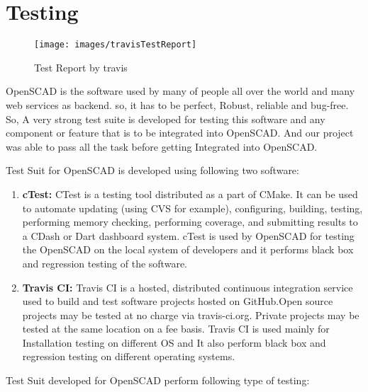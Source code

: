 \section{Testing}
\begin{figure}[H]
    \centering
    \texttt{[image: images/travisTestReport]}
    \caption{Test Report by travis}
    \label{fig:travisTestReport}
\end{figure}

OpenSCAD is the software used by many of people all over the world and many web services as backend. so, it has to be perfect, Robust, reliable and bug-free. So, A very strong test suite is developed for testing this software and any component or feature that is to be integrated into OpenSCAD. And our project was able to pass all the task before getting Integrated into OpenSCAD.

Test Suit for OpenSCAD is developed using following two software:

\begin{enumerate}
    \item \textbf{cTest:} CTest is a testing tool distributed as a part of CMake. It can be used to automate updating (using CVS for example), configuring, building, testing, performing memory checking, performing coverage, and submitting results to a CDash or Dart dashboard system.
    cTest is used by OpenSCAD for testing the OpenSCAD on the local system of developers and it performs black box and regression testing of the software.
   
    \item \textbf{Travis CI:} Travis CI is a hosted, distributed continuous integration service used to build and test software projects hosted on GitHub.Open source projects may be tested at no charge via travis-ci.org. Private projects may be tested at the same location on a fee basis.
    Travis CI is used mainly for Installation testing on different OS and It also perform  black box and regression testing on different operating systems.
   
\end{enumerate}

Test Suit developed for OpenSCAD perform following type of testing:
 
